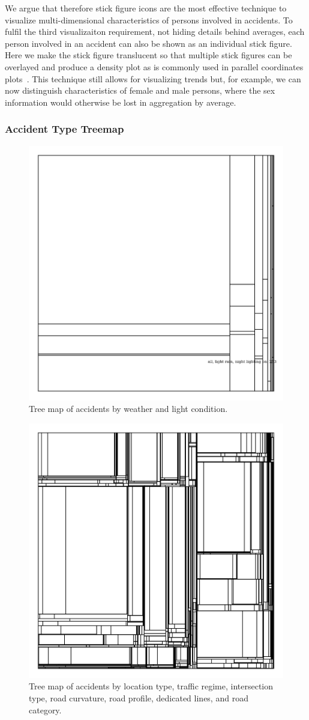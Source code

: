 We argue that therefore stick figure icons are the most effective technique to visualize multi-dimensional characteristics of persons involved in accidents.
To fulfil the third visualizaiton requirement, not hiding details behind averages, each person involved in an accident can also be shown as an individual stick figure. Here we make the stick figure translucent so that multiple stick figures can be overlayed and produce a density plot as is commonly used in parallel coordinates plots~\cite{Wegman1990}.
This technique still allows for visualizing trends but, for example, we can now distinguish characteristics of female and male persons, where the sex information would otherwise be lost in aggregation by average.

\subsubsection{Accident Type Treemap}
\begin{figure}
    \centering
    \includegraphics[width=0.6\linewidth]{figures/tree-treemap-weather-light-condition.png}
    \caption{Tree map of accidents by weather and light condition.}
    \label{figure-treemap-weather-light-condition}
\end{figure}
\begin{figure}
    \centering
    \includegraphics[width=0.6\linewidth]{figures/tree-treemap-location-type-traffic-regime-intersection-type-road-curvature-road-profile-dedicated-line-road-category.png}
    \caption{Tree map of accidents by location type, traffic regime, intersection type, road curvature, road profile, dedicated lines, and road category.}
    \label{figure-treemap-many}
\end{figure}
